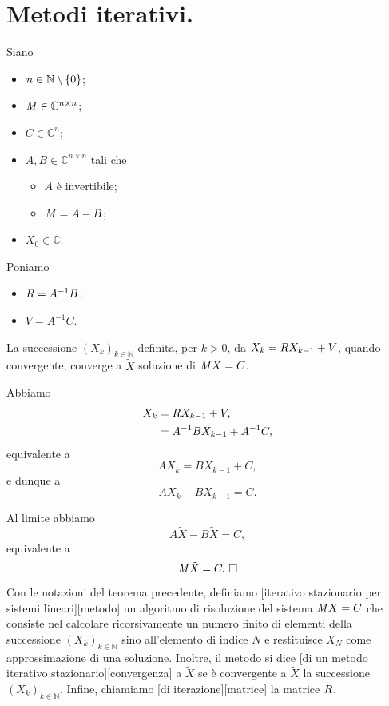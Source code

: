 \section{Metodi iterativi.}
\label{MetodiNumericiPerSistemiLineari_MetodiIterativi}
\begin{Theorem}
  \label{th_MetodiIterativiPerSistemiLineari}
  Siano
  \begin{itemize}
    \item $n \in \mathbb{N} \setminus \lbrace 0 \rbrace$;
    \item $\mathit{M} \in \mathbb{C}^{n \times n}$;
    \item $C \in \mathbb{C}^n$;
    \item $A, B \in \mathbb{C}^{n \times n}$ tali che
      \begin{itemize}
        \item $A$ \`e invertibile;
        \item $\mathit{M} = A - B$;
      \end{itemize}
    \item $X_0 \in \mathbb{C}$.
  \end{itemize}
  Poniamo
  \begin{itemize}
    \item $R = A^{-1}B$;
    \item $V = A^{-1} C$.
  \end{itemize}
  La successione $(X_k)_{k \in \mathbb{N}}$ definita, per $k > 0$, da
  $X_k = R X_{k - 1} + V$, quando convergente,
  converge a $\tilde{X}$ soluzione di $\mathit{M} X = C$.
\end{Theorem}
\Proof Abbiamo
\begin{align*}
  X_k
  &= R X_{k - 1} + V,\\
  &= A^{-1}B X_{k - 1} + A^{-1} C,
\end{align*}
equivalente a
\[
  A X_k = B X_{k - 1} + C,
\]
e dunque a
\[
  A X_k - B X_{k - 1} = C.
\]
\par Al limite abbiamo
\[
  A \tilde{X} - B \tilde{X} = C,
\]
equivalente a
\[
  \mathit{M} \tilde{X} = C.\text{ $\square$}
\]
\begin{Definition}
  Con le notazioni del teorema precedente, definiamo
  [iterativo stazionario per sistemi lineari][metodo]
  un algoritmo di risoluzione del sistema $\mathit{M} X = C$ che consiste
  nel calcolare ricorsivamente un numero finito di  elementi della
  successione $(X_k)_{k \in \mathbb{N}}$ sino all'elemento di indice $N$ e
  restituisce $X_N$ come approssimazione di una soluzione.
  Inoltre, il metodo si dice
  [di un metodo iterativo stazionario][convergenza]
  a $\tilde{X}$
  se \`e convergente a $\tilde{X}$ la successione
  $(X_k)_{k \in \mathbb{N}}$.
  Infine, chiamiamo
  [di iterazione][matrice]
  la matrice $R$.
\end{Definition}
